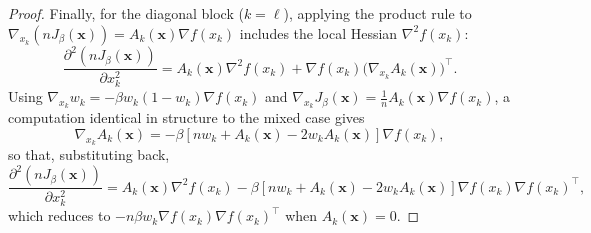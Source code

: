 \documentclass{article}
\theoremstyle{plain}
\theoremstyle{definition}
\theoremstyle{remark}
\newcommand{\prefactor}[2]{A_{#1}(#2)}
\newcommand{\xx}{\mathbf{x}}
\begin{document}
\begin{proof}
    Finally, for the diagonal block ($k=\ell$), applying the product rule to $\nabla_{x_k}(nJ_\beta(\xx))=\prefactor{k}{\xx}\nabla f(x_k)$ includes the local Hessian $\nabla^2 f(x_k)$:
    \[
        \frac{\partial^2(nJ_\beta(\xx))}{\partial x_k^2} = \prefactor{k}{\xx}\nabla^2f(x_k) + \nabla f(x_k)\bigl(\nabla_{x_k}\prefactor{k}{\xx}\bigr)^\top.
    \]
    Using $\nabla_{x_k}w_k=-\beta w_k(1-w_k)\nabla f(x_k)$ and $\nabla_{x_k}J_\beta(\xx)=\frac1n\prefactor{k}{\xx}\nabla f(x_k)$, a computation identical in structure to the mixed case gives
    \[
        \nabla_{x_k}\prefactor{k}{\xx} = -\beta\left[nw_k+\prefactor{k}{\xx}-2w_k\prefactor{k}{\xx}\right]\nabla f(x_k),
    \]
    so that, substituting back,
    \[
        \frac{\partial^2(nJ_\beta(\xx))}{\partial x_k^2} = \prefactor{k}{\xx}\nabla^2f(x_k) - \beta\left[nw_k+\prefactor{k}{\xx}-2w_k\prefactor{k}{\xx}\right]\nabla f(x_k)\nabla f(x_k)^\top,
    \]
    which reduces to $-n\beta w_k\nabla f(x_k)\nabla f(x_k)^\top$ when $\prefactor{k}{\xx}=0$. \qedhere
\end{proof}
\end{document}
